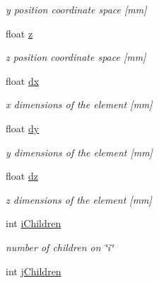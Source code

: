 \begin{DoxyCompactItemize}
\begin{DoxyCompactList}\small\item\em y position coordinate space \mbox{[}mm\mbox{]} \end{DoxyCompactList}\item 
\hypertarget{classElement_a9673a121290573dd806820bbdf5a5c27}{float \hyperlink{classElement_a9673a121290573dd806820bbdf5a5c27}{z}}\label{classElement_a9673a121290573dd806820bbdf5a5c27}

\begin{DoxyCompactList}\small\item\em z position coordinate space \mbox{[}mm\mbox{]} \end{DoxyCompactList}\item 
\hypertarget{classElement_a596ef7a8bf00c43ec69ab34552e0bcf5}{float \hyperlink{classElement_a596ef7a8bf00c43ec69ab34552e0bcf5}{dx}}\label{classElement_a596ef7a8bf00c43ec69ab34552e0bcf5}

\begin{DoxyCompactList}\small\item\em x dimensions of the element \mbox{[}mm\mbox{]} \end{DoxyCompactList}\item 
\hypertarget{classElement_a8fb86b3d6acc44716d46124fe1ca3910}{float \hyperlink{classElement_a8fb86b3d6acc44716d46124fe1ca3910}{dy}}\label{classElement_a8fb86b3d6acc44716d46124fe1ca3910}

\begin{DoxyCompactList}\small\item\em y dimensions of the element \mbox{[}mm\mbox{]} \end{DoxyCompactList}\item 
\hypertarget{classElement_a14e5f51fbe61d3bdbbe4d44c65f03dc5}{float \hyperlink{classElement_a14e5f51fbe61d3bdbbe4d44c65f03dc5}{dz}}\label{classElement_a14e5f51fbe61d3bdbbe4d44c65f03dc5}

\begin{DoxyCompactList}\small\item\em z dimensions of the element \mbox{[}mm\mbox{]} \end{DoxyCompactList}\item 
\hypertarget{classElement_a37c5bed50bec96560c89fddb9dd10d6a}{int \hyperlink{classElement_a37c5bed50bec96560c89fddb9dd10d6a}{i\+Children}}\label{classElement_a37c5bed50bec96560c89fddb9dd10d6a}

\begin{DoxyCompactList}\small\item\em number of children on \char`\"{}i\char`\"{} \end{DoxyCompactList}\item 
\hypertarget{classElement_a7347c8c6c06759f8ae2a2cd15543c85b}{int \hyperlink{classElement_a7347c8c6c06759f8ae2a2cd15543c85b}{j\+Children}}\label{classElement_a7347c8c6c06759f8ae2a2cd15543c85b}


\end{DoxyCompactItemize}
